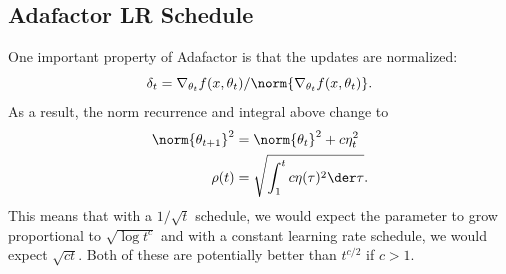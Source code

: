 \subsection{Adafactor LR Schedule}

One important property of Adafactor is that the updates are normalized:
\begin{equation*}
    \delta_t = \nabla_{\theta_t} f(x, \theta_t) / \norm{\nabla_{\theta_t} f(x, \theta_t)} .
\end{equation*}
As a result, the norm recurrence and integral above change to
\begin{align*}
    \norm{\theta_{t+1}}^2 &= \norm{\theta_t}^2 + c \eta_t^2 \\
    \rho(t) &= \sqrt{\int_1^t c \eta(\tau)^2 \der \tau} .
\end{align*}
This means that with a $1 / \sqrt{t}$ schedule, we would expect the parameter to grow proportional to $\sqrt{\log t^c}$ and with a constant learning rate schedule, we would expect $\sqrt{ct}$. Both of these are potentially better than $t^{c/2}$ if $c > 1$.